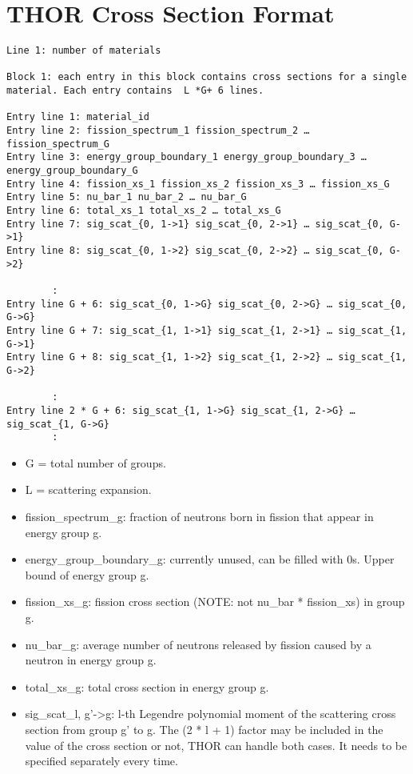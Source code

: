 \section{THOR Cross Section Format}\label{ch:inp:sec:xsfile}
\begin{verbatim}
Line 1: number of materials

Block 1: each entry in this block contains cross sections for a single material. Each entry contains  L *G+ 6 lines.

Entry line 1: material_id
Entry line 2: fission_spectrum_1 fission_spectrum_2 … fission_spectrum_G
Entry line 3: energy_group_boundary_1 energy_group_boundary_3 … energy_group_boundary_G
Entry line 4: fission_xs_1 fission_xs_2 fission_xs_3 … fission_xs_G
Entry line 5: nu_bar_1 nu_bar_2 … nu_bar_G
Entry line 6: total_xs_1 total_xs_2 … total_xs_G
Entry line 7: sig_scat_{0, 1->1} sig_scat_{0, 2->1} … sig_scat_{0, G->1}
Entry line 8: sig_scat_{0, 1->2} sig_scat_{0, 2->2} … sig_scat_{0, G->2}

        :
Entry line G + 6: sig_scat_{0, 1->G} sig_scat_{0, 2->G} … sig_scat_{0, G->G}
Entry line G + 7: sig_scat_{1, 1->1} sig_scat_{1, 2->1} … sig_scat_{1, G->1}
Entry line G + 8: sig_scat_{1, 1->2} sig_scat_{1, 2->2} … sig_scat_{1, G->2}

        :
Entry line 2 * G + 6: sig_scat_{1, 1->G} sig_scat_{1, 2->G} … sig_scat_{1, G->G}
        :

\end{verbatim}

\begin{itemize}
\item G = total number of groups.
\item L = scattering expansion.
\item fission\_spectrum\_g: fraction of neutrons born in fission that appear in energy group g.
\item energy\_group\_boundary\_g: currently unused, can be filled with 0s. Upper bound of energy group g.
\item fission\_xs\_g: fission cross section (NOTE: not nu\_bar * fission\_xs) in group g.
\item nu\_bar\_g: average number of neutrons released by fission caused by a neutron in energy group g.
\item total\_xs\_g: total cross section in energy group g.
\item sig\_scat\_{l, g’->g}: l-th Legendre polynomial moment of the scattering cross section from group g’ to g. The (2 * l + 1) factor may be included in the value of the cross section or not, THOR can handle both cases. It needs to be specified separately every time.
\end{itemize}



